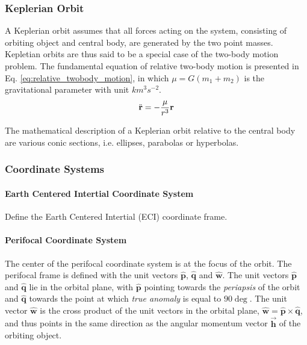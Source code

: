 \subsubsection{Keplerian Orbit}

A Keplerian orbit assumes that all forces acting on the system, consisting of orbiting object and central body, are generated by the two point masses. Kepletian orbits are thus said to be a special case of the two-body motion problem. The fundamental equation of relative two-body motion is presented in Eq. \ref{eq:relative_twobody_motion}, in which $\mu = G(m_1 + m_2)$ is the gravitational parameter with unit $km^3s^{-2}$. \\

\begin{equation}
    \Ddot{\mathbf{r}} = - \frac{\mu}{r^3} \mathbf{r}
    \label{eq:relative_twobody_motion}
\end{equation}{}


The mathematical description of a Keplerian orbit relative to the central body are various conic sections, i.e. ellipses, parabolas or hyperbolas. \\







\subsubsection{Coordinate Systems}


\paragraph{Earth Centered Intertial Coordinate System} 

Define the Earth Centered Intertial (ECI) coordinate frame. \\



\paragraph{Perifocal Coordinate System} 
The center of the perifocal coordinate system is at the focus of the orbit. The perifocal frame is defined with the unit vectors $\hat{\mathbf{p}}$, $\hat{\mathbf{q}}$ and $\hat{\mathbf{w}}$. The unit vectors $\hat{\mathbf{p}}$ and $\hat{\mathbf{q}}$ lie in the orbital plane, with $\hat{\mathbf{p}}$ pointing towards the \textit{periapsis} of the orbit and $\hat{\mathbf{q}}$ towards the point at which \textit{true anomaly} is equal to $90 \deg$. The unit vector $\hat{\mathbf{w}}$ is the cross product of the unit vectors in the orbital plane, $\hat{\mathbf{w}} = \hat{\mathbf{p}} \times \hat{\mathbf{q}}$, and thus points in the same direction as the angular momentum vector $\Vec{\mathbf{h}}$ of the orbiting object. \\

